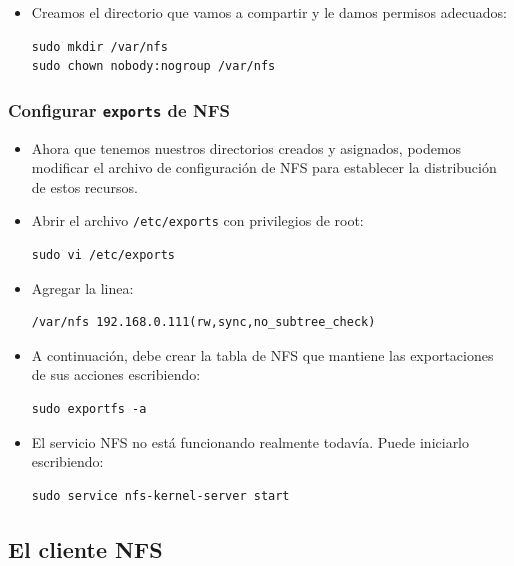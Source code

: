 \documentclass[a4paper,11pt]{article}
\begin{document}
    \begin{itemize}
      \item Creamos el directorio que vamos a compartir y le damos permisos
            adecuados:
\begin{verbatim}
sudo mkdir /var/nfs
sudo chown nobody:nogroup /var/nfs
\end{verbatim}
\end{itemize}

\subsubsection{Configurar \texttt{exports} de NFS}
\begin{itemize}
\item Ahora que tenemos nuestros directorios creados y asignados, podemos
      modificar el archivo de configuración de NFS para establecer la
      distribución de estos recursos.
\item Abrir el archivo \texttt{/etc/exports} con privilegios de root:
\begin{verbatim}
sudo vi /etc/exports
\end{verbatim}
\item Agregar la linea:
\begin{verbatim}
/var/nfs 192.168.0.111(rw,sync,no_subtree_check)
\end{verbatim}
\item A continuación, debe crear la tabla de NFS que mantiene las
exportaciones de sus acciones escribiendo:
\begin{verbatim}
sudo exportfs -a
\end{verbatim}
\item El servicio NFS no está funcionando realmente todavía. Puede
iniciarlo escribiendo:
\begin{verbatim}
sudo service nfs-kernel-server start
\end{verbatim}

\end{itemize}

\subsection{El cliente NFS}
\end{document}
